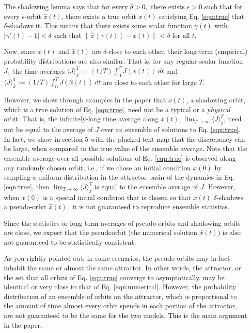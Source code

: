 \documentclass[11pt]{article}
\begin{document}
The shadowing lemma says that for every $\delta > 0,$ there exists $\epsilon > 0$ such that for every $\epsilon$-orbit $\hat{x}(t)$, there exists a true orbit $x(t)$ satisfying Eq. \ref{eqn:true} that $\delta$-shadows it. This means that there exists some scalar function $\gamma(t)$ with $|\gamma'(t) - 1| < \delta$ such that $\| \hat{x}(\gamma(t)) - x(t) \| < \delta$ for all $t.$

Now, since $x(t)$ and $\hat{x}(t)$ are $\delta$-close to each other, their long-term (empirical) probability distributions are also similar. That is, for any regular scalar function $J,$ the time-averages $\langle J\rangle_x^T := (1/T)\int_0^T J(x(t))\: dt$ and 
$\langle J\rangle_{\hat{x}}^T := (1/T) \int_0^T J(\hat{x}(t)) \: dt$ are close to each other for large $T.$ 

However, we show through examples in the paper that $x(t)$, a shadowing orbit, which is a true solution of Eq. \ref{eqn:true}, need not be a typical or a {\em physical} orbit. That is, the infinitely-long time average along $x(t)$, $\lim_{T\to\infty} \langle J\rangle_x^T$, need not be equal to the average of $J$ over an ensemble of solutions to Eq. \ref{eqn:true}. In fact, we show in section 5 with the plucked tent map that the discrepancy can be large, when compared to the true value of the ensemble average. Note that the ensemble average over all possible solutions of Eq. \ref{eqn:true} is observed along any randomly chosen orbit, i.e., if we chose an initial condition $x(0)$ by sampling a uniform distribution in the attractor basin of the dynamics in Eq. \ref{eqn:true}, then $\lim_{T\to\infty}\langle J\rangle_x^T$ is equal to the ensemble average of $J.$ However, when $x(0)$ is a special initial condition that is chosen so that $x(t)$ $\delta$-shadows a pseudo-orbit $\hat{x}(t),$ it is not guaranteed to reproduce ensemble statistics.

Since the statistics or long-term averages of pseudo-orbits and shadowing orbits are close, we expect that the pseudoorbit (the numerical solution $\hat{x}(t)$) is also not guaranteed to be statistically consistent. 

As you rightly pointed out, in some scenarios, the pseudo-orbits may in fact inhabit the same or almost the same attractor. In other words, the attractor, or the set that all orbits of Eq. \ref{eqn:true} converge to asymptotically, may be identical or very close to that of Eq. \ref{eqn:numerical}. However, the probability distribution of an ensemble of orbits on the attractor, which is proportional to the amount of time almost every orbit spends in each portion of the attractor, are not guaranteed to be the same for the two models. This is the main argument in the paper.
\end{document}
